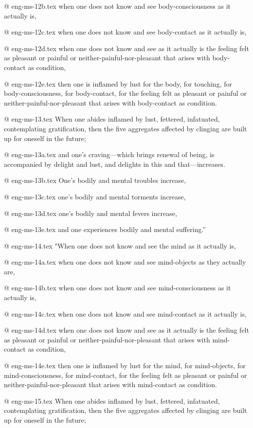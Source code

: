 @ eng-ms-12b.tex
when one does not know and see body-consciousness as it actually is,

@ eng-ms-12c.tex
when one does not know and see body-contact as it actually is,

@ eng-ms-12d.tex
when one does not know and see as it actually is the feeling felt as pleasant or painful or neither-painful-nor-pleasant that arises with body-contact as condition,

@ eng-ms-12e.tex
then one is inflamed by lust for the body, for touching, for body-consciousness, for body-contact, for the feeling felt as pleasant or painful or neither-painful-nor-pleasant that arises with body-contact as condition.

@ eng-ms-13.tex
When one abides inflamed by lust, fettered, infatuated, contemplating gratification, then the five aggregates affected by clinging are built up for oneself in the future;

@ eng-ms-13a.tex
and one’s craving—which brings renewal of being, is accompanied by delight and lust, and delights in this and that—increases.

@ eng-ms-13b.tex
One’s bodily and mental troubles increase,

@ eng-ms-13c.tex
one’s bodily and mental torments increase,

@ eng-ms-13d.tex
one’s bodily and mental fevers increase,

@ eng-ms-13e.tex
and one experiences bodily and mental suffering.”

@ eng-ms-14.tex
"When one does not know and see the mind as it actually is,

@ eng-ms-14a.tex
when one does not know and see mind-objects as they actually are,

@ eng-ms-14b.tex
when one does not know and see mind-consciousness as it actually is,

@ eng-ms-14c.tex
when one does not know and see mind-contact as it actually is,

@ eng-ms-14d.tex
when one does not know and see as it actually is the feeling felt as pleasant or painful or neither-painful-nor-pleasant that arises with mind-contact as condition,

@ eng-ms-14e.tex
then one is inflamed by lust for the mind, for mind-objects, for mind-consciousness, for mind-contact, for the feeling felt as pleasant or painful or neither-painful-nor-pleasant that arises with mind-contact as condition.

@ eng-ms-15.tex
When one abides inflamed by lust, fettered, infatuated, contemplating gratification, then the five aggregates affected by clinging are built up for oneself in the future;

